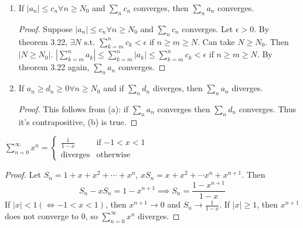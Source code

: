 \begin{thm}
	\begin{enumerate}[label=(\alph*)]
		\item If $|a_{n}| \le c_n \forall n\ge N_0$ and $\sum_{n}{c_{n}}$ converges, then $\sum_{n}{a_{n}}$ converges.
		      \begin{proof}
			      Suppose $|a_{n}|\le c_{n} \forall n\ge N_0$ and $\sum_{n}^{}{c_{n}}$ converges. Let $\epsilon>0$. By theorem 3.22, $\exists N \text{ s.t. } \sum_{k=m}^{n}{c_{k}}< \epsilon $ if $n\ge m\ge N$. Can take $N\ge N_0$. Then $|N\ge N_0|$. $|\sum_{k=m}^{n}{a_{k}}|\le \sum_{k=m}^{n}{|a_{k}|}\le \sum_{k=m}^{n}{c_k}<\epsilon$ if $n\ge m\ge N$. By theorem 3.22 again, $\sum_{n}{a_{n}}$ converges.
		      \end{proof}
		\item If $a_{n}\ge d_{n}\ge 0 \forall n\ge N_0$ and if $\sum_{n}{d_n}$ diverges, then $\sum_{n}{a_{n}}$ diverges.
		      \begin{proof}
			      This follows from (a): if $\sum_{n}{a_{n}}$ converges then $\sum_{n}{d_{n}}$ converges. Thus it's contrapositive, (b) is true.
		      \end{proof}
	\end{enumerate}
\end{thm}

\begin{thm}
	$\sum_{n=0}^{\infty }{x^{n}}=
		\begin{cases}
			\frac{1}{1-x}   & \text{if $-1<x<1$} \\
			\text{diverges} & \text{otherwise}
		\end{cases}
	$
	\begin{proof}
		Let $S_n=1+x+x^2+\cdots +x^{n}$, $xS_n= x + x^2+ \cdots x^{n}+x^{n+1}$. Then
		\[
			S_n-xS_n=1-x^{n+1} \implies S_n=\frac{1-x^{n+1}}{1-x}
		\]
		If $|x|<1 (\Leftrightarrow -1<x<1)$, then $x^{n+1}\to 0$ and $S_n\to \frac{1}{1-x}$. If $|x|\ge 1$, then $x^{n+1}$ does not converge to 0, so $\sum_{n=0}^{\infty}{x^{n}}$ diverges.
	\end{proof}
\end{thm}



